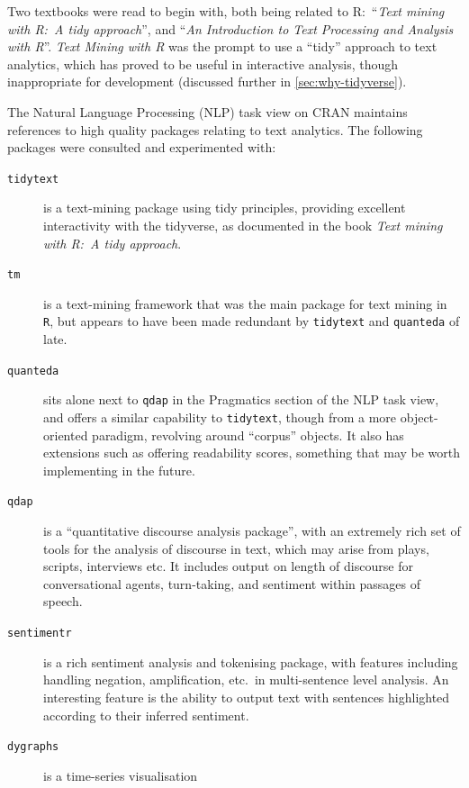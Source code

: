 \documentclass[11pt, a4paper, titlepage]{report}
\begin{document}
Two textbooks were read to begin with, both being related to R:\
``\textit{Text mining with R:~A tidy approach}''\autocite{silge2017text}, and
``\textit{An Introduction to Text Processing and Analysis with
R}''\autocite{clark2019text}. \textit{Text Mining with R} was the
prompt to use a ``tidy'' approach to text analytics, which has proved
to be useful in interactive analysis, though inappropriate for
development (discussed further in \underline{\cref{sec:why-tidyverse}}).

The Natural Language Processing (NLP) task view on CRAN maintains
references to high quality packages relating to text
analytics\autocite{wild:_cran_task_view}. The following packages were
consulted and experimented with:

\begin{description}
\item[\texttt{tidytext}\autocite{Silge2016tidytext}] is a text-mining
  package using tidy principles, providing excellent interactivity
  with the tidyverse, as documented in the book \textit{Text mining
    with R:~A tidy approach}\autocite{silge2017text}.
\item[\texttt{tm}\autocite{feinerer18}] is a text-mining framework
  that was the main package for text mining in \texttt{R}, but appears
  to have been made redundant by \texttt{tidytext} and
  \texttt{quanteda} of late.
\item[\texttt{quanteda}\autocite{benoit18}] sits alone next to
  \texttt{qdap} in the Pragmatics section of the NLP task view, and
  offers a similar capability to \texttt{tidytext}, though from a more
  object-oriented paradigm, revolving around ``corpus'' objects. It
  also has extensions such as offering readability scores, something
  that may be worth implementing in the future.
\item[\texttt{qdap}\autocite{rinker19qdap}] is a ``quantitative discourse
  analysis package'', with an extremely rich set of tools for the
  analysis of discourse in text, which may arise from plays, scripts,
  interviews etc. It includes output on length of discourse for
  conversational agents, turn-taking, and sentiment within passages of
  speech.
\item[\texttt{sentimentr}\autocite{rinker19sent}] is a rich sentiment analysis
  and tokenising package, with features including handling negation,
  amplification, etc.\ in multi-sentence level analysis. An
  interesting feature is the ability to output text with sentences
  highlighted according to their inferred sentiment.
\item[\texttt{dygraphs}\autocite{vanderkam18}] is a time-series visualisation

\end{description}
\end{document}
